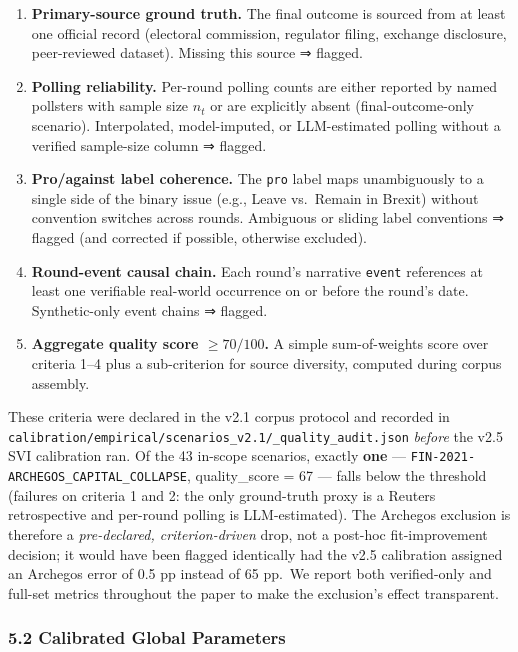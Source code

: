 \documentclass[
]{article}
\providecommand{\tightlist}{%
  \setlength{\itemsep}{0pt}\setlength{\parskip}{0pt}}
\begin{document}
\begin{enumerate}
\def\labelenumi{\arabic{enumi}.}
\tightlist
\item
  \textbf{Primary-source ground truth.} The final outcome is sourced
  from at least one official record (electoral commission, regulator
  filing, exchange disclosure, peer-reviewed dataset). Missing this
  source ⇒ flagged.
\item
  \textbf{Polling reliability.} Per-round polling counts are either
  reported by named pollsters with sample size \(n_t\) or are explicitly
  absent (final-outcome-only scenario). Interpolated, model-imputed, or
  LLM-estimated polling without a verified sample-size column ⇒ flagged.
\item
  \textbf{Pro/against label coherence.} The \texttt{pro} label maps
  unambiguously to a single side of the binary issue (e.g., Leave
  vs.~Remain in Brexit) without convention switches across rounds.
  Ambiguous or sliding label conventions ⇒ flagged (and corrected if
  possible, otherwise excluded).
\item
  \textbf{Round-event causal chain.} Each round's narrative
  \texttt{event} references at least one verifiable real-world
  occurrence on or before the round's date. Synthetic-only event chains
  ⇒ flagged.
\item
  \textbf{Aggregate quality score \(\geq 70 / 100\).} A simple
  sum-of-weights score over criteria 1--4 plus a sub-criterion for
  source diversity, computed during corpus assembly.
\end{enumerate}

These criteria were declared in the v2.1 corpus protocol and recorded in
\texttt{calibration/empirical/scenarios\_v2.1/\_quality\_audit.json}
\emph{before} the v2.5 SVI calibration ran. Of the 43 in-scope
scenarios, exactly \textbf{one} ---
\texttt{FIN-2021-ARCHEGOS\_CAPITAL\_COLLAPSE}, quality\_score = 67 ---
falls below the threshold (failures on criteria 1 and 2: the only
ground-truth proxy is a Reuters retrospective and per-round polling is
LLM-estimated). The Archegos exclusion is therefore a
\emph{pre-declared, criterion-driven} drop, not a post-hoc
fit-improvement decision; it would have been flagged identically had the
v2.5 calibration assigned an Archegos error of 0.5 pp instead of 65
pp.~We report both verified-only and full-set metrics throughout the
paper to make the exclusion's effect transparent.

\subsubsection{5.2 Calibrated Global
Parameters}\label{calibrated-global-parameters}
\end{document}
